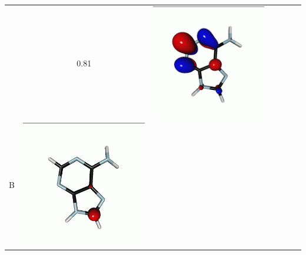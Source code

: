 \documentclass[journal=jctcce,manuscript=article]{achemso}
\begin{document}
\begin{table}[H]
\begin{tabular}{ l| c c c | c c c }
\begin{minipage}{0.2\textwidth}
    \end{minipage}
    & 0.81
    & 
    \begin{minipage}{0.2\textwidth}
        \centering
        \includegraphics[scale=0.10]{NTO/Adenine_C/1p_Cs.png}
    \end{minipage}
    \\
        B &  
    \begin{minipage}{0.2\textwidth}
        \centering
        \includegraphics[scale=0.10]{NTO/Adenine_C/2h_C1.png}

\end{minipage}
\end{tabular}
\end{table}
\end{document}
